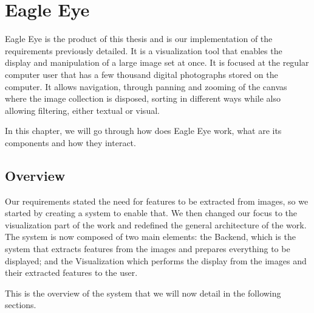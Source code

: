 \chapter{Eagle Eye}
\label{cha:eagle_eye}


Eagle Eye is the product of this thesis and is our implementation of the requirements previously detailed. It is a visualization tool that enables the display and manipulation of a large image set at once. It is focused at the regular computer user that has a few thousand digital photographs stored on the computer. It allows navigation, through panning and zooming of the canvas where the image collection is disposed, sorting in different ways while also allowing filtering, either textual or visual.

In this chapter, we will go through how does Eagle Eye work, what are its components and how they interact.


\section{Overview}

Our requirements stated the need for features to be extracted from images, so we  started by creating a system to enable that. We then changed our focus to the visualization part of the work and redefined the general architecture of the work. The system is now composed of two main elements: the Backend, which is the system that extracts features from the images and prepares everything to be displayed; and the Visualization which performs the display from the images and their extracted features to the user.


This is the overview of the system that we will now detail in the following sections.




